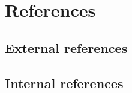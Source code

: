 \section{References} \label{s:introduction:references}
	\begin{comment}
		$<$List all of the applicable reference documents. The references are separated into “external” references
		that are imposed external to the project and “internal” references that are imposed from within to the
		project. This may also be at the end of the document.$>$
	\end{comment}

\subsection*{External references} \label{s:introduction:external-references}
	\begin{comment}
		$<$List references to the relevant policies or laws that give rise to the need for this plan, e.g.		
		\begin{enumerate}
		\item Laws
		\item Government regulations
		\item Standards (e.g., governmental and/or consensus)
		\item IEEE Std. 829-2008 - IEEE Standard for Software and System Test Documentation.
		IEEE Computer Society, 2008.
		\item Policies
		\end{enumerate}
		The reference to this standard includes how and if it has been tailored for this project, an overview of
		the level(s) of documentation expected, and their contents (or a reference to an organizational standard
		or document that delineates the expected test documentation details).$>$
	\end{comment}


\subsection*{Internal references} \label{s:introduction:internal-references}
	\begin{comment}
		$<$ List references to documents such as other plans or task descriptions that supplement this plan, e.g.:
		\begin{enumerate}
		\item Project authorization
		\item Project plan (or project management plan)
		\item Quality assurance plan
		\item Configuration management plan
		\end{enumerate}
		$>$
	\end{comment}

